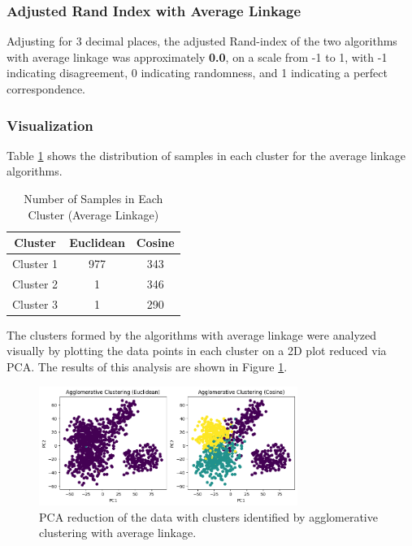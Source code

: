 \documentclass[11pt]{article}
\begin{document}
\subsubsection*{Adjusted Rand Index with Average Linkage}
Adjusting for 3 decimal places, the adjusted Rand-index of the two algorithms with average linkage was approximately \textbf{0.0}, on a scale from -1 to 1, with -1 indicating disagreement, 0 indicating randomness, and 1 indicating a perfect correspondence.

\subsubsection*{Visualization}
Table \ref{tab:average_clusters_prop} shows the distribution of samples in each cluster for the average linkage algorithms.

\begin{table}[ht]
    \centering
    \begin{tabular}{|c|c|c|}
    \hline
    Cluster & Euclidean & Cosine \\
    \hline
    Cluster 1 & 977 & 343 \\
    Cluster 2 & 1 & 346 \\
    Cluster 3 & 1 & 290 \\
    \hline
    \end{tabular}
    \caption{Number of Samples in Each Cluster (Average Linkage)}
    \label{tab:average_clusters_prop}
\end{table}

The clusters formed by the algorithms with average linkage were analyzed visually by plotting the data points in each cluster on a 2D plot reduced via PCA. The results of this analysis are shown in Figure \ref{fig:cluster_visual_average_linkage}.

\begin{figure}[H]
    \centering
    \includegraphics[width=0.75\textwidth]{Images/average linkage cluster visual.png}
    \caption{PCA reduction of the data with clusters identified by agglomerative clustering with average linkage.}
    \label{fig:cluster_visual_average_linkage}
\end{figure}
\end{document}
